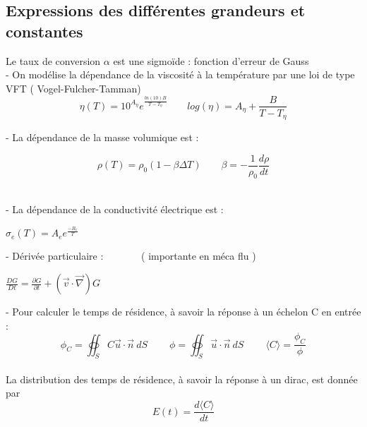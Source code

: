 \documentclass[12pt, a4paper, french, BCOR = 0pt, DIV = 10]{scrartcl}
\begin{document}
	\subsection{ Expressions des différentes grandeurs et constantes}
	Le taux de conversion $\alpha$ est une sigmoïde : fonction d'erreur de Gauss\\ [0.3cm]
	
	- On modélise la dépendance de la viscosité à la température par une loi de type VFT ( Vogel-Fulcher-Tamman) \\ [0.5 cm]
	
	\centering
	$$
	\eta (T)  = 10^{A_{\eta}} e^{\frac{ln(10) B}{T-T_{\eta}}} ~~~~~~~~~ log(\eta) = A_{\eta} + \frac{B}{T-T_{\eta}}
	$$
	
	
	\raggedright
	- La dépendance de la masse volumique est : \\ [0.5 cm]
	\begin{center}
		
		
		$$
		\rho(T) = \rho_{0}  (1 - \beta \Delta T) ~~~~~~~~~ 
		\beta = -\frac{1}{\rho_{0}} \frac{d\rho}{dt}
		$$
		\\
	\end{center}
	
	
	
	- La dépendance de la conductivité électrique est : \\ [0.5 cm]
	\begin{center}
		$ 
		\sigma_{e} (T) =  A_{e} e^{\frac{-B_{e}}{T}}
		$
	\end{center}
	
	- Dérivée particulaire : ~~~~~~~( importante en méca flu )\\
	
	\begin{center}
		$ \frac{DG}{Dt}=\frac{\partial G}{\partial t} + (\vec {v} \cdot \vec {\nabla } ) G
		$ \\    
	\end{center}
	
	
	
	- Pour calculer le temps  de résidence, à savoir la réponse à un échelon C en entrée :\\ [0.5cm]
	$$
	\phi_{C} =  \oiint_S C\vec{u} \cdot \vec{n}~dS  ~~~~~~~~~~ \phi = \oiint_S \vec{u} \cdot \vec{n}~dS  ~~~~~~~~~~
	\langle C \rangle = \frac{\phi_{C}}{\phi}
	$$ 
	\\ [0.5 cm]
	La distribution des temps de résidence, à savoir la réponse à un dirac, est donnée par \[E(t)=\frac{d\langle C \rangle}{dt}\]
	
\end{document}
